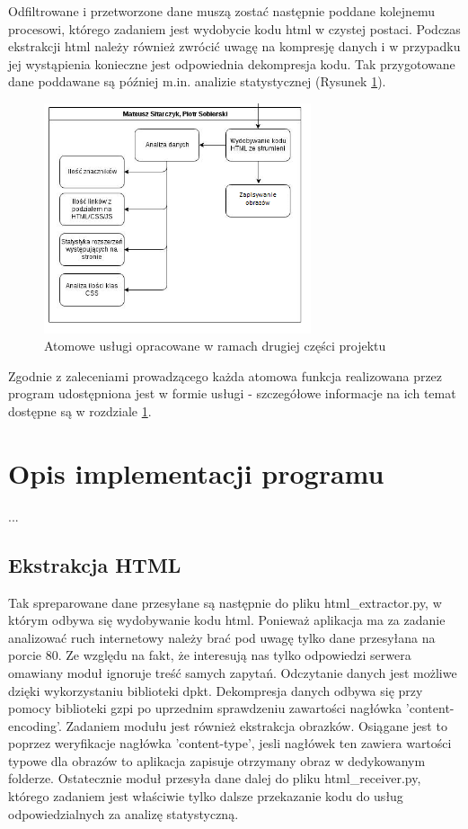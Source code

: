 \documentclass[12pt]{article}
\begin{document}
Odfiltrowane i przetworzone dane muszą zostać następnie poddane kolejnemu procesowi, którego zadaniem jest wydobycie kodu html w czystej postaci. Podczas ekstrakcji html należy również zwrócić uwagę na kompresję danych i w przypadku jej wystąpienia konieczne jest odpowiednia dekompresja kodu. 
Tak przygotowane dane poddawane są później m.in. analizie statystycznej (Rysunek \ref{img:funkcje2}). 

\begin{figure}[h]
\centering
\caption{Atomowe usługi opracowane w ramach drugiej części projektu}
\label{img:funkcje2}
\includegraphics[width=0.7\textwidth]{Wykres2.png}
\end{figure}


Zgodnie z zaleceniami prowadzącego każda atomowa funkcja realizowana przez program udostępniona jest w formie usługi - szczegółowe informacje na ich temat dostępne są w rozdziale \ref{dzialanie}. 

\section{Opis implementacji programu}
\label{dzialanie}
...
\subsection{Ekstrakcja HTML}
Tak spreparowane dane przesyłane są następnie do pliku html\_extractor.py, w którym odbywa się wydobywanie kodu html. 
Ponieważ aplikacja ma za zadanie analizować ruch internetowy należy brać pod uwagę tylko dane przesyłana na porcie 80. Ze względu na fakt, że interesują nas tylko odpowiedzi serwera omawiany moduł ignoruje treść samych zapytań. Odczytanie danych jest możliwe dzięki wykorzystaniu biblioteki dpkt. Dekompresja danych odbywa się przy pomocy biblioteki gzpi po uprzednim sprawdzeniu zawartości nagłówka 'content-encoding'. Zadaniem modułu jest również ekstrakcja obrazków. Osiągane jest to poprzez weryfikacje nagłówka 'content-type', jesli nagłówek ten zawiera wartości typowe dla obrazów to aplikacja zapisuje otrzymany obraz w dedykowanym folderze. Ostatecznie moduł przesyła dane dalej do pliku html\_receiver.py, którego zadaniem jest właściwie tylko dalsze przekazanie kodu do usług odpowiedzialnych za analizę statystyczną.
\end{document}
